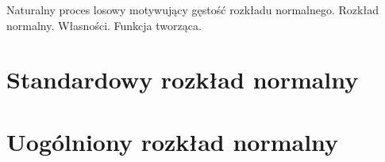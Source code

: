 {
\makeatletter
{}
\makeatother
\graphicspath{{../probabil}}

\begin{questiontext}
	Naturalny proces losowy motywujący gęstość rozkładu normalnego. Rozkład normalny. Własności. Funkcja tworząca.
\end{questiontext}

\section{Standardowy rozkład normalny}


\section{Uogólniony rozkład normalny}

}